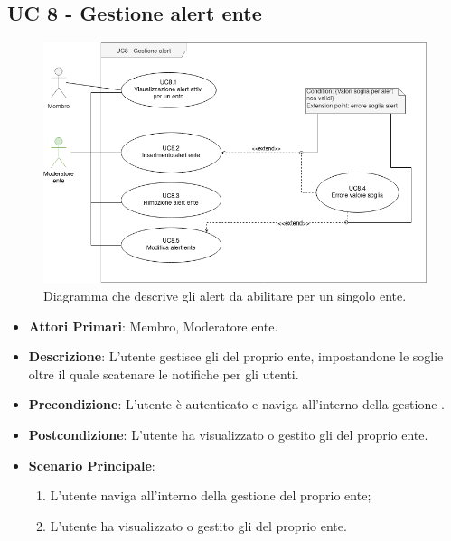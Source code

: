 	\subsection{UC 8 - Gestione alert ente}
		
		\begin{figure}[H]
			\centering
			\includegraphics[scale=0.60]{res/images/uc8}
			\caption{Diagramma che descrive gli alert da abilitare per un singolo ente.}
		\end{figure}

		\begin{itemize}
			\item \textbf{Attori Primari}: Membro, Moderatore ente.
			\item \textbf{Descrizione}: L'utente gestisce gli  del proprio ente, impostandone le soglie oltre il quale scatenare le notifiche per gli utenti.
			\item \textbf{Precondizione}: L'utente è autenticato e naviga all'interno della gestione .
			\item \textbf{Postcondizione}: L'utente ha visualizzato o gestito gli  del proprio ente.
			\item \textbf{Scenario Principale}:
			\begin{enumerate}
				\item{L'utente naviga all'interno della gestione  del proprio ente;}
				\item{L'utente ha visualizzato o gestito gli  del proprio ente.}
			\end{enumerate}	
		\end{itemize}
			
